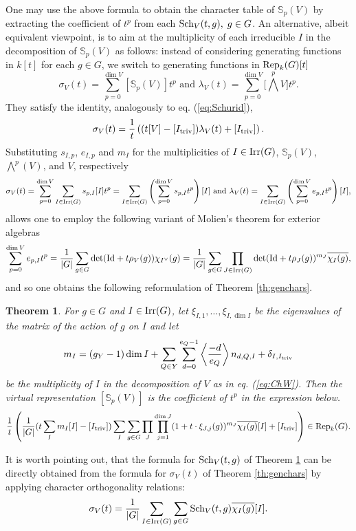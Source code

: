 \documentclass[10pt]{amsart}
\newtheorem{theorem}{Theorem}[subsection]
\theoremstyle{definition}
\begin{document}
One may use the above formula to obtain the character table of $\mathbb{S}_p(V)$ by extracting the coefficient of $t^p$ from each ${\rm Sch}_V(t,g),\;g\in G$. An alternative, albeit equivalent viewpoint, is to aim at the multiplicity of each irreducible $I$ in the decomposition of $\mathbb{S}_p(V)$ as follows: instead of considering generating functions in $k[t]$ for each $g\in G$, we switch to generating functions in ${\rm Rep}_k(G)[t]$
\[
\sigma_V(t)=\sum_{p=0}^{\dim V}[\mathbb{S}_p(V)]t^p\text{ and }\lambda_V(t)=\sum_{p=0}^{\dim V} \big[\bigwedge^pV] t^p.
\]
They satisfy the identity, analogously to eq. (\ref{eq:Schurid}),
\[
\sigma_V(t)
=\frac{1}{t}\left((t[V]-[I_{\rm triv}])\lambda_V(t)+[I_{\rm triv}]\right).
\]
Substituting $s_{I,p}$, $e_{I,p}$ and $m_I$ for the multiplicities of $I\in{\rm Irr}(G)$, $\mathbb{S}_p(V)$, $\bigwedge^p(V)$, and $V$, respectively
\[
\sigma_V(t)
=\sum_{p=0}^{\dim V}\sum_{I\in {\rm Irr}(G)} s_{p,I}[I]t^p
=\sum_{I\in {\rm Irr}(G)}\left(\sum_{p=0}^{\dim V} s_{p,I}t^p\right)[I]
\text{ and }
\lambda_V(t)
=\sum_{I\in {\rm Irr}(G)}\left(\sum_{p=0}^{\dim V} e_{p,I}t^p\right)[I],
\]
allows one to employ the following variant of Molien's theorem for exterior algebras \cite[5.2]{BensonPolInv}
\[
\sum_{p=0}^{\dim V} e_{p,I}t^p
=
\frac{1}{|G|}\sum_{g\in G}
\det({\rm Id}+t\rho_V(g))\chi_{I^\vee}(g)
=
\frac{1}{|G|}\sum_{g\in G}
\prod_{J\in{\rm Irr}(G)}
\det({\rm Id}+t\rho_J(g))^{m_J}\overline{\chi_{I}(g)},
\]
and so one obtains the following reformulation of Theorem \ref{th:genchars}.
\begin{theorem}\label{th:Molien}
For $g\in G$ and $I\in{\rm Irr}(G)$, let $\xi_{I,1},\ldots,\xi_{I,\dim I}$ be the eigenvalues of the matrix of the action of $g$ on $I$ and let 
\[
m_I=(g_Y-1)\dim I+\sum_{Q\in Y}\sum_{d=0}^{e_Q-1}\left\langle \frac{-d}{e_Q}\right\rangle n_{d,Q,I}+\delta_{I,I_{\rm triv}}
\]
be the multiplicity of $I$ in the decomposition of $V$ as in eq. (\ref{eq:ChW}). Then the virtual representation $[\mathbb{S}_p(V)]$  is the coefficient of $t^p$ in the expression below.
\[
\frac{1}{t}
\left(
\frac{1}{|G|}
(t\sum_{I}m_I[I]-[I_{\rm triv}])\sum_{I}\sum_{g\in G}
\prod_{J}
\prod_{j=1}^{\dim J}(1+t\cdot\xi_{J,j}(g))^{m_J}\overline{\chi_{I}(g)}[I]+[I_{\rm triv}]\right) \in {\rm Rep}_k(G).
\]
\end{theorem}

It is worth pointing out, that the formula for ${\rm Sch}_V(t,g)$ of Theorem \ref{th:Molien} can be directly obtained from the formula for $\sigma_V(t)$ of Theorem \ref{th:genchars} by applying character orthogonality relations:
\[
\sigma_V(t)
=
\frac{1}{|G|}
\sum_{I\in {\rm Irr}(G)}
\sum_{g\in G}
{\rm Sch}_V(t,g)\overline{\chi_I(g)}[I].
\]
\end{document}
